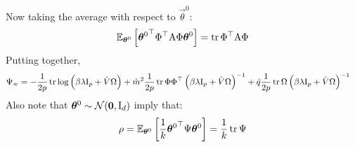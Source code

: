 \documentclass[11pt]{article}
\numberwithin{equation}{section}
\begin{document}
Now taking the average with respect to $\vec{\theta}^{0}$:
\begin{align}
	\mathbb{E}_{\bm{\theta}^{0}}\left[{\bm{\theta}^{0}}^{\top}\Phi^{\top}\text{A}\Phi\bm{\theta}^{0}\right] = \tr\Phi^{\top}\text{A}\Phi
\end{align}
Putting together,
\begin{align}
\Psi_{w} &=	-\frac{1}{2p}	\tr\log \left(\beta\lambda\text{I}_{p}+\hat{V}\Omega\right)+\hat{m}^{2}\frac{1}{2p}\tr \Phi\Phi^{\top}\left(\beta\lambda\text{I}_{p}+\hat{V}\Omega\right)^{-1} +\hat{q}\frac{1}{2p}\tr \Omega \left(\beta\lambda\text{I}_{p}+\hat{V}\Omega\right)^{-1}
\end{align}
Also note that $\bm{\theta}^{0}\sim\mathcal{N}(\bm{0},\text{I}_{d})$ imply that:
\begin{equation}
	\rho = \mathbb{E}_{\bm{\theta}^{0}}\left[\frac{1}{k}{\bm{\theta}^{0}}^{\top}\Psi\bm{\theta}^{0}\right] = \frac{1}{k}\tr\Psi
\end{equation}
\end{document}
